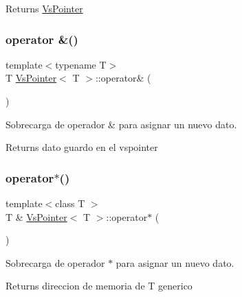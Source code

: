 \begin{DoxyReturn}{Returns}
\hyperlink{class_vs_pointer}{Vs\+Pointer} 
\end{DoxyReturn}
\mbox{\label{class_vs_pointer_a0994de6e663a59aa7cb18109ded98e28}} 
\subsubsection{\texorpdfstring{operator \&()}{operator \&()}}
{\footnotesize\ttfamily template$<$typename T$>$ \\
T \hyperlink{class_vs_pointer}{Vs\+Pointer}$<$ T $>$\+::operator\& (\begin{DoxyParamCaption}{ }\end{DoxyParamCaption})}



Sobrecarga de operador \& para asignar un nuevo dato. 

\begin{DoxyReturn}{Returns}
dato guardo en el vspointer 
\end{DoxyReturn}
\mbox{\label{class_vs_pointer_a6b59daca87b17efea69428a180857a38}} 
\subsubsection{\texorpdfstring{operator$\ast$()}{operator*()}}
{\footnotesize\ttfamily template$<$class T $>$ \\
T \& \hyperlink{class_vs_pointer}{Vs\+Pointer}$<$ T $>$\+::operator$\ast$ (\begin{DoxyParamCaption}{ }\end{DoxyParamCaption})}



Sobrecarga de operador $\ast$ para asignar un nuevo dato. 

\begin{DoxyReturn}{Returns}
direccion de memoria de T generico 
\end{DoxyReturn}
\mbox{\label{class_vs_pointer_a2dce5e7bf3f34c84debbd01b0c685d10}} 
